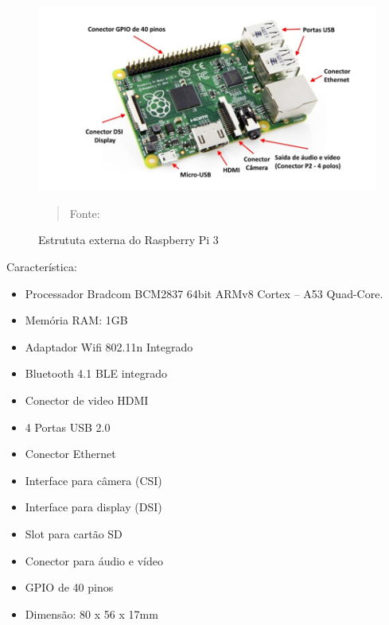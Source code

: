 \documentclass[12pt, a4paper]{article}
\begin{document}
\begin{figure}[H]
\begin{center}
			\caption{Estrututa externa do Raspberry Pi 3}
			\includegraphics[width=.9\textwidth]{Figuras/RASP.PNG}
		
            \vspace*{\fill} 
            \begin{quote} 
            \centering 
           Fonte: \cite{raspb}
            \end{quote}
            \vspace*{\fill}
			\label{fig:raspb}
\end{center}
\end{figure}


Característica:

\begin{itemize}
\item Processador Bradcom BCM2837 64bit ARMv8 Cortex – A53 Quad-Core.
\item Memória RAM: 1GB
\item Adaptador Wifi 802.11n Integrado
\item Bluetooth 4.1 BLE integrado
\item Conector de video HDMI
\item 4 Portas USB 2.0
\item Conector Ethernet 
\item Interface para câmera (CSI)
\item Interface para display (DSI)
\item Slot para cartão SD
\item Conector para áudio e vídeo
\item GPIO de 40 pinos
\item Dimensão: 80 x 56 x 17mm
\end{itemize}
\end{document}
